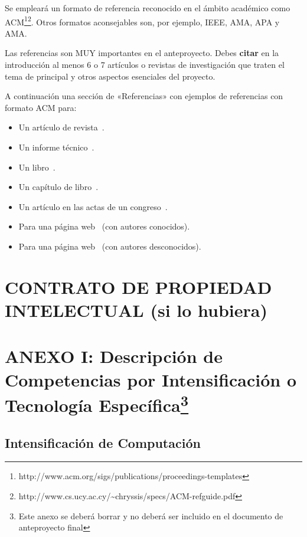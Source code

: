 \documentclass{pre-tfg}
\begin{document}
Se empleará un formato de referencia reconocido en el ámbito académico como
ACM\footnote{http://www.acm.org/sigs/publications/proceedings-templates}\footnote{http://www.cs.ucy.ac.cy/\~{}chryssis/specs/ACM-refguide.pdf}.
Otros formatos aconsejables son, por ejemplo, IEEE, AMA, APA y AMA.

Las referencias son MUY importantes en el anteproyecto. Debes \textbf{citar} en la
introducción al menos 6 o 7 artículos o revistas de investigación que traten el tema de
principal y otros aspectos esenciales del proyecto.


A continuación una sección de «Referencias» con ejemplos de referencias con formato ACM para:

\begin{itemize}
\item Un artículo de revista~\cite{Bow93}.
\item Un informe técnico~\cite{Ding97}.
\item Un libro~\cite{Tavel07}.
\item Un capítulo de libro~\cite{Greiner99}.
\item Un artículo en las actas de un congreso~\cite{Frohlic00}.
\item Para una página web~\cite{Steele04} (con autores conocidos).
\item Para una página web~\cite{Oxygen} (con autores desconocidos).
\end{itemize}



\singlespacing


\section{CONTRATO DE PROPIEDAD INTELECTUAL (si lo hubiera)}

\newpage
\section*{ANEXO I: Descripción de Competencias por Intensificación o Tecnología
Específica\footnote{Este anexo se deberá borrar y no deberá ser incluido en el documento de anteproyecto final}}

\subsection*{Intensificación de Computación}
\end{document}
